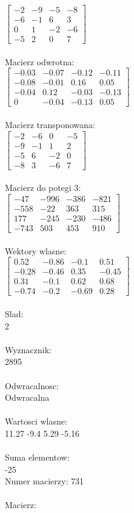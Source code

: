 \documentclass[a4paper,12pt]{article}
\begin{document}
$\begin{bmatrix} -2&-9&-5&-8\\-6&-1&6&3\\0&1&-2&-6\\-5&2&0&7 \end{bmatrix}$
\\
\\
Macierz odwrotna:\\

$\begin{bmatrix} -0.03&-0.07&-0.12&-0.11\\-0.08&-0.01&0.16&0.05\\-0.04&0.12&-0.03&-0.13\\0&-0.04&-0.13&0.05 \end{bmatrix}$
\\
\\
Macierz transponowana:\\

$\begin{bmatrix} -2&-6&0&-5\\-9&-1&1&2\\-5&6&-2&0\\-8&3&-6&7 \end{bmatrix}$
\\
\\
Macierz do potegi 3:\\

$\begin{bmatrix} -47&-996&-386&-821\\-558&-22&363&315\\177&-245&-230&-486\\-743&503&453&910 \end{bmatrix}$
\\
\\
Wektory wlasne:\\

$\begin{bmatrix} 0.52&-0.86&-0.1&0.51\\-0.28&-0.46&0.35&-0.45\\0.31&-0.1&0.62&0.68\\-0.74&-0.2&-0.69&0.28 \end{bmatrix}$
\\
\\
Slad:\\
2
\\
\\
Wyznacznik:\\
2895
\\
\\
Odwracalnosc:\\
Odwracalna
\\
\\
Wartosci wlasne:\\
11.27 -9.4 5.29 -5.16
\\
\\
Suma elementow:\\
-25
\\
\newpage
Numer macierzy:
731
\\
\\
Macierz:\\
\end{document}
